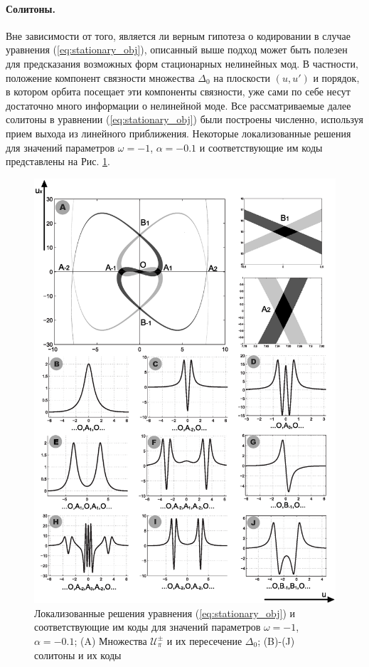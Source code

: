 \paragraph{Солитоны.}
Вне зависимости от того, является ли верным гипотеза о кодировании в случае уравнения (\ref{eq:stationary_obj}), описанный выше подход может быть полезен для предсказания возможных форм стационарных нелинейных мод.
В частности, положение компонент связности множества $\Delta_0$ на плоскости $(u,u')$ и порядок, в котором орбита посещает эти компоненты связности, уже сами по себе несут достаточно много информации о нелинейной моде.
Все рассматриваемые далее солитоны в уравнении (\ref{eq:stationary_obj}) были построены численно, используя прием выхода из линейного приближения.
Некоторые локализованные решения для значений параметров $\omega = -1$, $\alpha = -0.1$ и соответствующие им коды представлены на Рис. \ref{pic:coding}.
%
\begin{figure}
\includegraphics[width=0.92\linewidth]{pic/coding.eps}
\caption{Локализованные решения уравнения (\ref{eq:stationary_obj}) и соответствующие им коды для значений параметров $\omega = -1$, $\alpha = -0.1$; (A) Множества $\mathcal{U}_{\pi}^{\pm}$ и их пересечение $\Delta_0$; (B)-(J) солитоны и их коды}
\label{pic:coding}
\end{figure}
%


